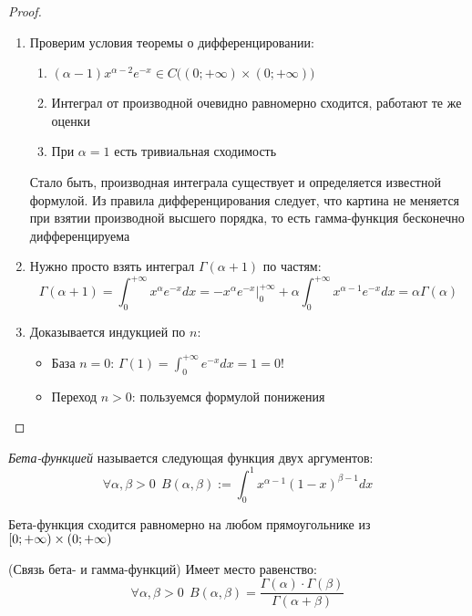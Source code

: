 \begin{proof}~
	\begin{enumerate}
		\item Проверим условия теоремы о дифференцировании:
		\begin{enumerate}
			\item $(\alpha - 1)x^{\alpha - 2}e^{-x} \in C\big((0; +\infty) \times (0; +\infty)\big)$
			
			\item Интеграл от производной очевидно равномерно сходится, работают те же оценки
			
			\item При $\alpha = 1$ есть тривиальная сходимость
		\end{enumerate}
		Стало быть, производная интеграла существует и определяется известной формулой. Из правила дифференцирования следует, что картина не меняется при взятии производной высшего порядка, то есть гамма-функция бесконечно дифференцируема
		
		\item Нужно просто взять интеграл $\Gamma(\alpha + 1)$ по частям:
		\[
			\Gamma(\alpha + 1) = \int_0^{+\infty} x^\alpha e^{-x}dx = -x^\alpha e^{-x}\Big|_0^{+\infty} + \alpha \int_0^{+\infty} x^{\alpha - 1}e^{-x}dx = \alpha\Gamma(\alpha)
		\]
		
		\item Доказывается индукцией по $n$:
		\begin{itemize}
			\item База $n = 0$: $\Gamma(1) = \int_0^{+\infty} e^{-x}dx = 1 = 0!$
			
			\item Переход $n > 0$: пользуемся формулой понижения
		\end{itemize}
	\end{enumerate}
\end{proof}

\begin{definition}
	\textit{Бета-функцией} называется следующая функция двух аргументов:
	\[
		\forall \alpha, \beta > 0\ \ B(\alpha, \beta) := \int_0^1 x^{\alpha - 1}(1 - x)^{\beta - 1}dx
	\]
\end{definition}

\begin{proposition}
	Бета-функция сходится равномерно на любом прямоугольнике из $\left[0; +\infty\right) \times (0; +\infty)$
\end{proposition}

\begin{theorem} (Связь бета- и гамма-функций)
	Имеет место равенство:
	\[
		\forall \alpha, \beta > 0\ \ B(\alpha, \beta) = \frac{\Gamma(\alpha) \cdot \Gamma(\beta)}{\Gamma(\alpha + \beta)}
	\]
\end{theorem}

